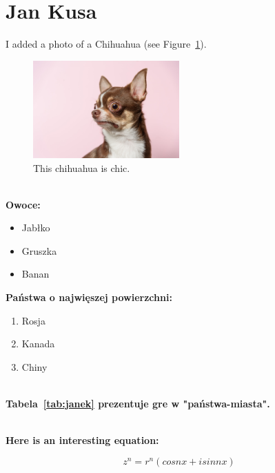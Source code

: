 \section{Jan Kusa}
\label{sec:jankusa}

I added a photo of a Chihuahua (see Figure~\ref{fig:dog}).

\begin{figure}[htbp] %
    \centering
    \includegraphics[width=0.5\textwidth]{pictures/chihuahua.jpg}
    \caption{This chihuahua is chic.}
    \label{fig:dog}
\end{figure}

\hline \hspace{1cm}\\

\textbf{Owoce:}
\begin{itemize}
  \item Jabłko
  \item Gruszka
  \item Banan
\end{itemize}

\textbf{Państwa o najwięszej powierzchni:}
\begin{enumerate}
  \item Rosja
  \item Kanada
  \item Chiny
\end{enumerate}

\hline \hspace{1cm}\\

\textbf{Tabela~\ref{tab:janek} prezentuje gre w "państwa-miasta".}



\hline \hspace{1cm}\\

\textbf{Here is an interesting equation:}

\[z^n = r^n(cosnx + isinnx)\]

